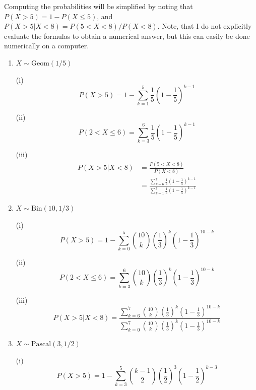 \begin{problem}{7} Computing the probabilities will be simplified by noting that $P(X>5) = 1 - P(X \le 5) $, and $P(X>5|X<8)  = P(5<X<8)/P(X<8)$.  Note, that I do not explicitly evaluate the formulas to obtain a numerical answer, but this can easily be done numerically on a computer.
\begin{enumerate}

\item  $X \sim \mathrm{Geom}(1/5)$

\indent (i)
\begin{equation*}
P(X>5)  = 1 - \sum_{k=1}^5 \frac{1}{5}\left( 1- \frac{1}{5}\right)^{k-1}
\end{equation*}

\indent (ii)
\begin{equation*}
P(2<X \le 6)  = \sum_{k=3}^6 \frac{1}{5}\left( 1- \frac{1}{5}\right)^{k-1}
\end{equation*}

\indent (iii)
\begin{align*}
P(X>5|X<8)  & = \frac{P(5<X<8)}{P(X<8)} \\
& = \frac{\sum_{k=6}^7 \frac{1}{5}\left( 1- \frac{1}{5}\right)^{k-1}}{\sum_{k=1}^7 \frac{1}{5}\left( 1- \frac{1}{5}\right)^{k-1}}
\end{align*}

\item  $X \sim \mathrm{Bin}(10, 1/3)$

\indent (i)
\begin{equation*}
P(X>5)  = 1 - \sum_{k=0}^5 \binom{10}{k}\left(\frac{1}{3}\right)^k\left(1-\frac{1}{3}\right)^{10-k}
\end{equation*}

\indent (ii)
\begin{equation*}
P(2<X \le 6)  = \sum_{k=3}^6 \binom{10}{k}\left(\frac{1}{3}\right)^k\left(1-\frac{1}{3}\right)^{10-k}
\end{equation*}

\indent (iii)
\begin{equation*}
P(X>5|X<8)  = \frac{\sum_{k=6}^7 \binom{10}{k}\left(\frac{1}{3}\right)^k\left(1-\frac{1}{3}\right)^{10-k}}{\sum_{k=0}^7 \binom{10}{k}\left(\frac{1}{3}\right)^k\left(1-\frac{1}{3}\right)^{10-k}}
\end{equation*}

\item  $X \sim \mathrm{Pascal}(3, 1/2)$

\indent (i)
\begin{equation*}
P(X>5)  = 1 - \sum_{k=3}^5 \binom{k-1}{2}\left(\frac{1}{2}\right)^3\left(1-\frac{1}{2}\right)^{k-3}
\end{equation*}


\end{enumerate}
\end{problem}

